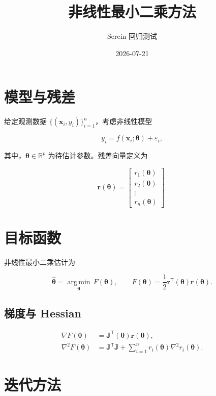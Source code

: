 \documentclass[UTF8]{ctexart}
\title{非线性最小二乘方法}
\author{Serein 回归测试}
\date{2026-07-21}
\begin{document}
\maketitle

\section{模型与残差}

给定观测数据 $\{(\bm x_i,y_i)\}_{i=1}^{n}$，考虑非线性模型

\begin{equation}
y_i=f(\bm x_i;\bm\theta)+\varepsilon_i,
\label{eq:nls-model}
\end{equation}

其中，$\bm\theta\in\mathbb{R}^{p}$ 为待估计参数。残差向量定义为

\begin{equation}
\bm r(\bm\theta)
=
\begin{bmatrix}
r_1(\bm\theta)\\
r_2(\bm\theta)\\
\vdots\\
r_n(\bm\theta)
\end{bmatrix}.
\label{eq:nls-residual}
\end{equation}

\section{目标函数}

非线性最小二乘估计为

\begin{equation}
\hat{\bm\theta}
=
\underset{\bm\theta}{\operatorname{arg\,min}}\,
F(\bm\theta),
\qquad
F(\bm\theta)
=
\frac{1}{2}\bm r^{\mathsf T}(\bm\theta)\bm r(\bm\theta).
\label{eq:nls-objective}
\end{equation}

\subsection{梯度与 Hessian}

\begin{align}
\nabla F(\bm\theta)
&=
\bm J^{\mathsf T}(\bm\theta)\bm r(\bm\theta),
\label{eq:nls-gradient}\\
\nabla^2F(\bm\theta)
&=
\bm J^{\mathsf T}\bm J
+
\sum_{i=1}^{n}r_i(\bm\theta)\nabla^2r_i(\bm\theta).
\label{eq:nls-hessian}
\end{align}

\section{迭代方法}
\end{document}
